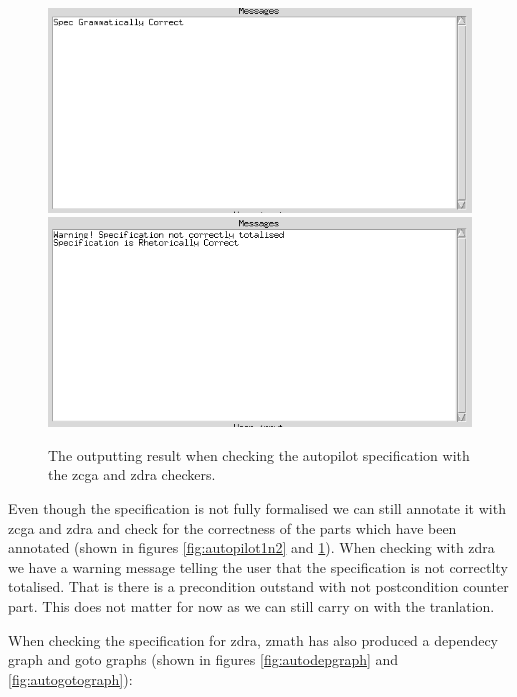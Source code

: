 \begin{figure}[H]
\begin{minipage}{0.45\textwidth}
\includegraphics[clip, trim=0cm 8.5cm 9cm 0cm, scale=0.5]{examples/semiform/zcgacorrect.png}
\includegraphics[clip, trim=0cm 8.5cm 9cm 0cm, scale=0.5]{examples/semiform/zdracorrect.png}
\vspace{-0.2in}
\caption{The outputting result when checking the autopilot specification with the \gls{zcga} and \gls{zdra} checkers. \label{fig:autopilotcorrect}}
\vspace{-0.2in}
\end{minipage}
\end{figure}

Even though the specification is not fully formalised we can still annotate it with \gls{zcga} and \gls{zdra} and check for the correctness of the parts which have been annotated (shown in figures \ref{fig:autopilot1n2} and \ref{fig:autopilotcorrect}). When checking with \gls{zdra} we have a warning message telling the user that the specification is not correctlty totalised. That is there is a precondition outstand with not postcondition counter part. This does not matter for now as we can still carry on with the tranlation.

When checking the specification for \gls{zdra}, \gls{zmath} has also produced a dependecy graph and goto graphs (shown in figures \ref{fig:autodepgraph} and \ref{fig:autogotograph}):

